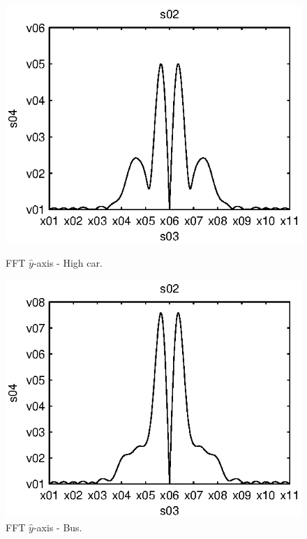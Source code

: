 \begin{subfigures}
\begin{figure}[thb]
\begin{minipage}{0.45\linewidth}
 	\centering
 	
	\includegraphics[width=1\linewidth]{images/fft-high_car-y}
  	\caption[FFT $\hat{y}$-axis - High car]{FFT $\hat{y}$-axis - High car.}
  	\label{fig:fft-high_car-y}
 \end{minipage} \hfill
 \begin{minipage}{0.45\linewidth}
 \centering
 	
	\includegraphics[width=1\linewidth]{images/fft-bus-y}
  	\caption[FFT $\hat{y}$-axis - Bus]{FFT $\hat{y}$-axis - Bus.}
  	\label{fig:fft-bus-y}
 \end{minipage}
\end{figure}
\end{subfigures}

